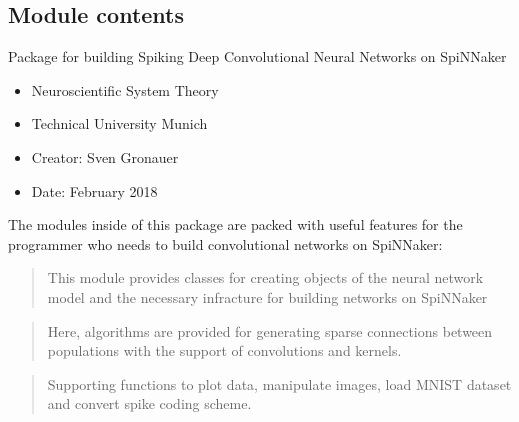 \documentclass[letterpaper,10pt,english]{sphinxmanual}
\begin{document}
\subsection{Module contents}
\label{\detokenize{SpikingConvNet:module-SpikingConvNet}}\label{\detokenize{SpikingConvNet:module-contents}}
Package for building Spiking Deep Convolutional Neural Networks on SpiNNaker
\begin{itemize}
\item {} 
Neuroscientific System Theory

\item {} 
Technical University Munich

\item {} 
Creator:    Sven Gronauer

\item {} 
Date:       February 2018

\end{itemize}

The modules inside of this package are packed with useful features
for the programmer who needs to build convolutional networks on SpiNNaker:

\begin{quote}

This module provides classes for creating objects of the neural network
model and the necessary infracture for building networks on SpiNNaker
\end{quote}

\begin{quote}

Here, algorithms are provided for generating sparse connections between
populations with the support of convolutions and kernels.
\end{quote}

\begin{quote}

Supporting functions to plot data, manipulate images, load MNIST dataset
and convert spike coding scheme.
\end{quote}
\end{document}
